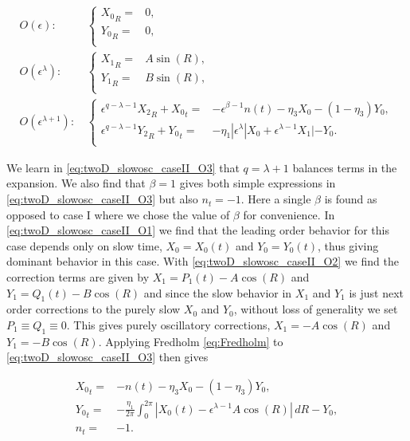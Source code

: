 \begin{align} \label{eq:twoD_slowosc_caseII_O1}
O(\epsilon):\, &\begin{cases}
	{X_0}_R =& 0, \\
	{Y_0}_R =& 0,\\
\end{cases}\\ \label{eq:twoD_slowosc_caseII_O2}
O(\epsilon^\lambda): \, & \begin{cases}
	{X_1}_R =& A\sin(R), \\
	{Y_1}_R =& B\sin(R),\\
\end{cases}\\
\label{eq:twoD_slowosc_caseII_O3}
O(\epsilon^{\lambda+1}):\, &\begin{cases}
	\epsilon^{q-\lambda-1}{X_2}_R+{X_0}_t =& -\epsilon^{\beta-1}n(t)-\eta_3X_0-(1-\eta_3)Y_0, \\
	\epsilon^{q-\lambda-1}{Y_2}_R+{Y_0}_t =& -\eta_1|\epsilon^{\lambda}|X_0+\epsilon^{\lambda-1}X_1|-Y_0.\\
\end{cases}
\end{align}

We learn in \eqref{eq:twoD_slowosc_caseII_O3} that $q=\lambda+1$ balances terms in the expansion. We also find that $\beta =1$ gives both simple expressions in \eqref{eq:twoD_slowosc_caseII_O3} but also $n_t=-1$. Here a single $\beta$ is found as opposed to case I where we chose the value of $\beta$ for convenience. In \eqref{eq:twoD_slowosc_caseII_O1} we find that the leading order behavior for this case depends only on slow time, $X_0=X_0(t)$ and $Y_0=Y_0(t)$, thus giving dominant behavior in this case. With \eqref{eq:twoD_slowosc_caseII_O2} we find the correction terms are given by $X_1=P_1(t)-A\cos(R)$ and $Y_1=Q_1(t)-B\cos(R)$ and since the slow behavior in $X_1$ and $Y_1$ is just next order corrections to the purely slow $X_0$ and $Y_0$, without loss of generality we set $P_1\equiv Q_1\equiv 0$. This gives purely oscillatory corrections, $X_1=-A\cos(R)$ and $Y_1=-B\cos(R)$. Applying Fredholm \eqref{eq:Fredholm} to \eqref{eq:twoD_slowosc_caseII_O3} then gives

\begin{equation}\label{eq:twoD_slowosc_caseII_fullinner}
\begin{aligned}
{X_0}_t =& -n(t) -\eta_3 X_0- (1-\eta_3)Y_0,\\
{Y_0}_t =& -\frac{\eta_1}{2\pi}\int_0^{2\pi}|X_0(t)-\epsilon^{\lambda-1}A\cos(R)|\,dR -Y_0,\\
n_t=& -1.
\end{aligned}
\end{equation}

